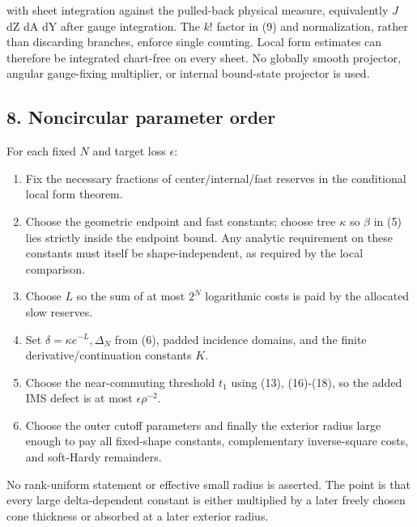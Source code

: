 with sheet integration against the pulled-back physical measure,
equivalently \(J\) dZ dA dY after gauge integration. The \(k\)! factor
in (9) and normalization, rather than discarding branches, enforce
single counting. Local form estimates can therefore be integrated
chart-free on every sheet. No globally smooth projector, angular
gauge-fixing multiplier, or internal bound-state projector is used.

\subsection{8. Noncircular parameter
order}\label{j-noncircular-parameter-order}

For each fixed \(N\) and target loss \(\epsilon\):

\begin{enumerate}
\def\labelenumi{\arabic{enumi}.}
\tightlist
\item
  Fix the necessary fractions of center/internal/fast reserves in the
  conditional local form theorem.
\item
  Choose the geometric endpoint and fast constants; choose tree
  \(\kappa\) so \(\beta\) in (5) lies strictly inside the endpoint
  bound. Any analytic requirement on these constants must itself be
  shape-independent, as required by the local comparison.
\item
  Choose \(L\) so the sum of at most \(2^{N}\) logarithmic costs is paid
  by the allocated slow reserves.
\item
  Set \(\delta =\kappa  e^{-L}, \Delta _{N}\) from (6), padded incidence
  domains, and the finite derivative/\allowbreak{}continuation constants \(K\).
\item
  Choose the near-commuting threshold \(t_{1}\) using (13), (16)-(18),
  so the added IMS defect is at most \(\epsilon  \rho ^{-2}\).
\item
  Choose the outer cutoff parameters and finally the exterior radius
  large enough to pay all fixed-shape constants, complementary
  inverse-square costs, and soft-Hardy remainders.
\end{enumerate}

No rank-uniform statement or effective small radius is asserted. The
point is that every large delta-dependent constant is either multiplied
by a later freely chosen cone thickness or absorbed at a later exterior
radius.
